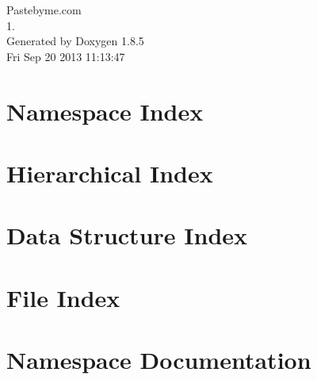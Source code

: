 \documentclass[twoside]{book}
\newcommand{\clearemptydoublepage}{%
  \newpage{\pagestyle{empty}\cleardoublepage}%
}
\begin{document}
\begin{titlepage}
\vspace*{7cm}
\begin{center}%
{\Large Pastebyme.\-com \\[1ex]\large 1. }\\
\vspace*{1cm}
{\large Generated by Doxygen 1.8.5}\\
\vspace*{0.5cm}
{\small Fri Sep 20 2013 11:13:47}\\
\end{center}
\end{titlepage}
\clearemptydoublepage
\tableofcontents
\clearemptydoublepage
{}

\chapter{Namespace Index}

\chapter{Hierarchical Index}

\chapter{Data Structure Index}

\chapter{File Index}

\chapter{Namespace Documentation}

\end{document}

